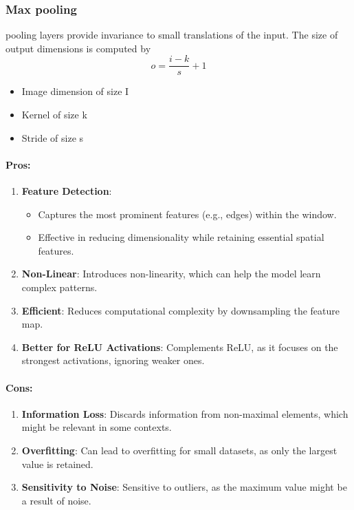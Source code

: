 \documentclass[11pt, english]{article}
\begin{document}
\subsubsection{Max pooling}
pooling layers provide invariance to small translations of the input.
The size of output dimensions is computed by 
 \[
 o = \frac{i-k}{s}+1
 \]
\begin{itemize}
    \item Image dimension of size I
    \item Kernel of size k 
    \item Stride of size s
\end{itemize}
\paragraph{\textbf{Pros}:}
\begin{enumerate}
    \item \textbf{Feature Detection}:
    \begin{itemize}
        \item Captures the most prominent features (e.g., edges) within the window.
        \item Effective in reducing dimensionality while retaining essential spatial features.
    \end{itemize}
    \item \textbf{Non-Linear}:
Introduces non-linearity, which can help the model learn complex patterns.
    \item \textbf{Efficient}:
Reduces computational complexity by downsampling the feature map.
    \item \textbf{Better for ReLU Activations}:
Complements ReLU, as it focuses on the strongest activations, ignoring weaker ones.

\end{enumerate}
\paragraph{\textbf{Cons}:}
\begin{enumerate}
    \item \textbf{Information Loss}:
Discards information from non-maximal elements, which might be relevant in some contexts.
    \item \textbf{Overfitting}:
Can lead to overfitting for small datasets, as only the largest value is retained.
    \item \textbf{Sensitivity to Noise}:
Sensitive to outliers, as the maximum value might be a result of noise.

\end{enumerate}
 
\end{document}
